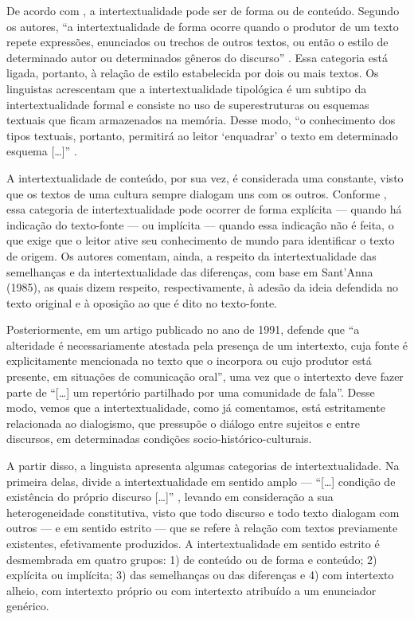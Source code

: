 \documentclass{textolivre}
\begin{document}
De acordo com \textcite{koch_coerencia_2015}, a intertextualidade pode ser de forma ou de conteúdo. Segundo os autores, “a intertextualidade de forma ocorre quando o produtor de um texto repete expressões, enunciados ou trechos de outros textos, ou então o estilo de determinado autor ou determinados gêneros do discurso” \cite[p. 92]{koch_coerencia_2015}. Essa categoria está ligada, portanto, à relação de estilo estabelecida por dois ou mais textos. Os linguistas acrescentam que a intertextualidade tipológica é um subtipo da intertextualidade formal e consiste no uso de superestruturas ou esquemas textuais que ficam armazenados na memória. Desse modo, “o conhecimento dos tipos textuais, portanto, permitirá ao leitor ‘enquadrar’ o texto em determinado esquema […]” \cite[p. 94]{koch_coerencia_2015}.

A intertextualidade de conteúdo, por sua vez, é considerada uma constante, visto que os textos de uma cultura sempre dialogam uns com os outros. Conforme \textcite{koch_coerencia_2015}, essa categoria de intertextualidade pode ocorrer de forma explícita — quando há indicação do texto-fonte — ou implícita — quando essa indicação não é feita, o que exige que o leitor ative seu conhecimento de mundo para identificar o texto de origem. Os autores comentam, ainda, a respeito da intertextualidade das semelhanças e da intertextualidade das diferenças, com base em Sant’Anna (1985), as quais dizem respeito, respectivamente, à adesão da ideia defendida no texto original e à oposição ao que é dito no texto-fonte.

Posteriormente, em um artigo publicado no ano de 1991, \textcite[p. 539]{koch__1991} defende que “a alteridade é necessariamente atestada pela presença de um intertexto, cuja fonte é explicitamente mencionada no texto que o incorpora ou cujo produtor está presente, em situações de comunicação oral”, uma vez que o intertexto deve fazer parte de “[…] um repertório partilhado por uma comunidade de fala”. Desse modo, vemos que a intertextualidade, como já comentamos, está estritamente relacionada ao dialogismo, que pressupõe o diálogo entre sujeitos e entre discursos, em determinadas condições socio-histórico-culturais.

A partir disso, a linguista apresenta algumas categorias de intertextualidade. Na primeira delas, divide a intertextualidade em sentido amplo — “[…] condição de existência do próprio discurso […]” \cite[p. 530]{koch__1991}, levando em consideração a sua heterogeneidade constitutiva, visto que todo discurso e todo texto dialogam com outros — e em sentido estrito — que se refere à relação com textos previamente existentes, efetivamente produzidos. A intertextualidade em sentido estrito é desmembrada em quatro grupos: 1) de conteúdo ou de forma e conteúdo; 2) explícita ou implícita; 3) das semelhanças ou das diferenças e 4) com intertexto alheio, com intertexto próprio ou com intertexto atribuído a um enunciador genérico.
\end{document}
